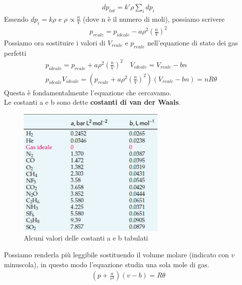 \documentclass[10pt,a4paper]{article}
\begin{document}
\begin{align*}
	dp_{tot} = k' \rho \sum_i dp_i 
\end{align*}
Essendo $dp_i = k \rho$ e $\rho \propto \frac{n}{V}$ (dove n è il numero di moli), possiamo scrivere
\begin{align*}
p_{reale} = p_{ideale}- a \rho^2 \left(\frac{n}{V}\right)^2
\end{align*}
Possiamo ora sostituire i valori di $V_{reale}$ e $p_{reale}$ nell'equazione di stato dei gas perfetti
\begin{align*}
	& p_{ideale} = p_{reale} + a \rho^2 \left(\frac{n}{V}\right)^2 \quad V_{ideale} = V_{reale} - b n\\
	& p_{ideale} V_{ideale} = \left(p_{reale} + a \rho^2 \left(\frac{n}{V}\right)^2 \right) \left( V_{reale} - b n \right) = n R \theta 
\end{align*}
Questa è fondamentalmente l'equazione che cercavamo.\\
Le costanti a e b sono dette \textbf{costanti di van der Waals}.
\begin{figure}[h!]
	\centering
	\includegraphics[width=0.5\linewidth]{../images/costantiaeb}
	\caption{Alcuni valori delle costanti a e b tabulati}
	\label{fig:costantiaeb}
\end{figure}
\FloatBarrier
Possiamo renderla più leggibile sostituendo il volume molare (indicato con $v$ minuscola), in questo modo l'equazione studia una sola mole di gas.  
\begin{align*}
\left( p + \frac{a}{v^2}\right)\left(v-b\right) = R \theta
\end{align*}
\end{document}

